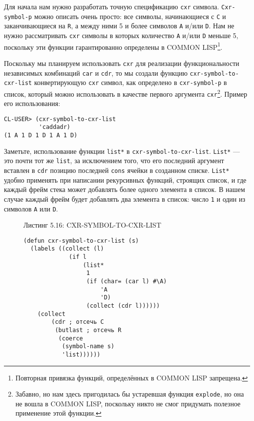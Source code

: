 Для начала нам нужно разработать точную спецификацию \verb|cxr| символа. \verb|Cxr-symbol-p| можно описать очень просто: все символы, начинающиеся с \verb|C| и заканчивающиеся на \verb|R|, а между ними 5 и более символов \verb|A| и/или \verb|D|. Нам не нужно рассматривать \verb|cxr| символы в которых количество \verb|A| и/или \verb|D| меньше 5, поскольку эти функции гарантированно определены в COMMON LISP\footnote{Повторная привязка функций, определённых в COMMON LISP запрещена.}.



Поскольку мы планируем использовать \verb"cxr" для реализации функциональности независимых комбинаций \verb"car" и \verb"cdr", то мы создали функцию \verb"cxr-symbol-to-cxr-list" конвертирующую \verb"cxr" символ, как определено в \verb"cxr-symbol-p" в список, который можно использовать в качестве первого аргумента \verb"cxr"\footnote{Забавно, но нам здесь пригодилась бы устаревшая функция \verb"explode", но она не вошла в COMMON LISP, поскольку никто не смог придумать полезное применение этой функции.}. Пример его использования:



\begin{verbatim}
CL-USER> (cxr-symbol-to-cxr-list
          'caddadr)
(1 A 1 D 1 D 1 A 1 D)
\end{verbatim}

Заметьте, использование функции \verb"list*" в \verb"cxr-symbol-to-cxr-list". \verb"List*" --- это почти тот же \verb"list", за исключением того, что его последний аргумент вставлен в \verb"cdr" позицию последней \verb"cons" ячейки в созданном списке. \verb"List*" удобно применять при написании рекурсивных функций, строящих список, и где каждый фрейм стека может добавлять более одного элемента в список. В нашем случае каждый фрейм будет добавлять два элемента в список: число \verb"1" и один из символов \verb"A" или \verb"D".

\begin{figure}Листинг 5.16: CXR-SYMBOL-TO-CXR-LIST\label{listing_5.16}
\listbegin
\begin{verbatim}
(defun cxr-symbol-to-cxr-list (s)
  (labels ((collect (l)
             (if l
                 (list*
                  1
                  (if (char= (car l) #\A)
                      'A
                      'D)
                  (collect (cdr l))))))
    (collect
        (cdr ; отсечь C
         (butlast ; отсечь R
          (coerce
           (symbol-name s)
           'list))))))
\end{verbatim}
\listend
\end{figure}


